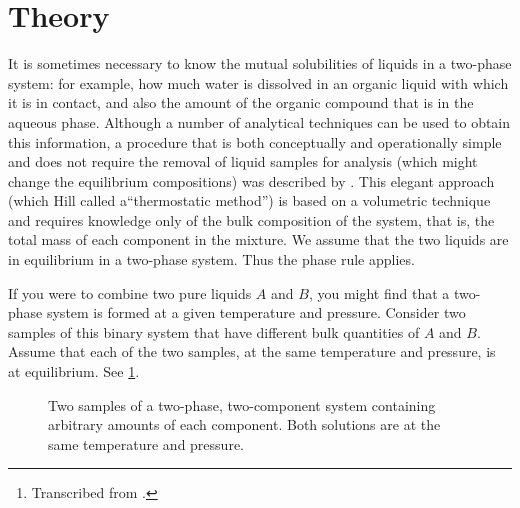 \maketitle

\begin{abstract}
\noindent To construct the mutual solubility curve of a binary two-phase liquid system (for example, 1-butanol/water or methanol/cyclohexane).\thanks{Transcribed from \textcite{nibler14}.}
\end{abstract}

\section{Theory}
\label{sec:theory}

It is sometimes necessary to know the mutual solubilities of liquids in a two-phase system: for example, how much water is dissolved in an organic liquid with which it is in contact, and also the amount of the organic compound that is in the aqueous phase. Although a number of analytical techniques can be used to obtain this information, a procedure that is both conceptually and operationally simple and does not require the removal of liquid samples for analysis (which might change the equilibrium compositions) was described by \textcite{hill1923mutual}. This elegant approach (which Hill called a``thermostatic method'') is based on a volumetric technique and requires knowledge only of the bulk composition of the system, that is, the total mass of each component in the mixture. We assume that the two liquids are in equilibrium in a two-phase system. Thus the phase rule applies.

If you were to combine two pure liquids \(A\) and \(B\), you might find that a two-phase system is formed at a given temperature and pressure. Consider two samples of this binary system that have different bulk quantities of \(A\) and \(B\). Assume that each of the two samples, at the same temperature and pressure, is at equilibrium. See \cref{fig:two_samples}.

\begin{figure}[htb]
	\centering
	\caption{Two samples of a two-phase, two-component system containing arbitrary amounts of each component. Both solutions are at the same temperature and pressure.}
	\label{fig:two_samples}	
\end{figure}

